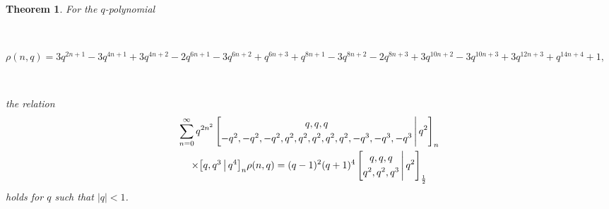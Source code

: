 \documentclass[12pt]{article}
\newtheorem{theorem}{Theorem}
\begin{document}
\begin{theorem}\label{qGuillerafirst}
 For the $q$-polynomial 

 \ 

\noindent $\rho(n, q) = 
 3 q^{2 n+1}-3 q^{4 n+1}+3 q^{4 n+2}-2 q^{6 n+1}-3 q^{6 n+2}+q^{6 n+3}+q^{8 n+1}-3 q^{8 n+2}-2 q^{8 n+3}+3 q^{10 n+2}-3 q^{10 n+3}+3 q^{12
 n+3}+q^{14 n+4}+1,    $ 

 \ 

\noindent the relation 
\begin{multline*}
 \sum_{n=0}^{\infty} q^{2 n^2} 
 \left[ \begin{matrix} q, q, q \vspace{1mm} \\ 
 -q^2, -q^2, -q^2, q^2, q^2, q^2, q^2, q^2, -q^3, -q^3, -q^3 
 \end{matrix} \, \Bigg| \, q^2 \right]_{n} \\ 
 \times \big[ \begin{matrix} q, q^3 
 \end{matrix} \, \big| \, q^4 \big]_{n} \rho(n, q) = 
 (q-1)^2 (q + 1)^4 
 \left[ \begin{matrix} q, q, q \vspace{1mm} \\ 
 q^2, q^2, q^3 \end{matrix} \, \Bigg| \, q^2 \right]_{\frac{1}{2}} 
\end{multline*}
 holds for $q$ such that $|q| < 1$. 
\end{theorem}
\end{document}
